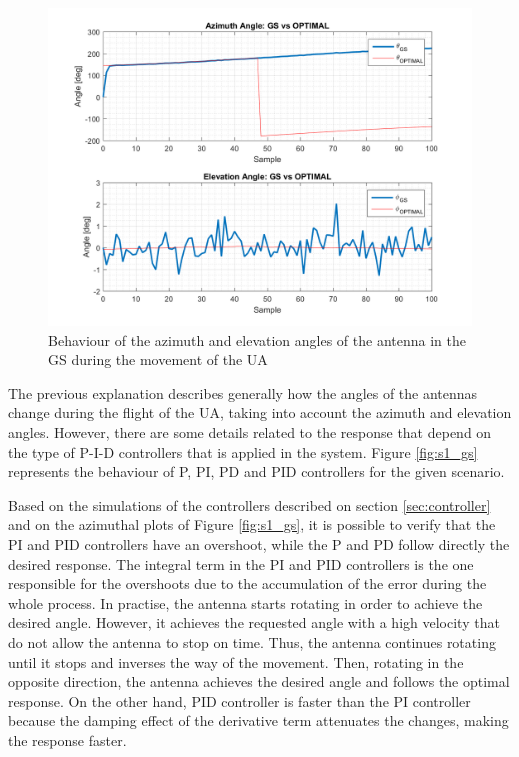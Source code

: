 \begin{figure}[H]
	\centering
	\includegraphics[scale=0.75]{figures/s1_pd_gs.png}
	\caption{Behaviour of the azimuth and elevation angles of the antenna in the GS during the movement of the UA}
	\label{fig:s1_pd_gs_alone}
\end{figure}

The previous explanation describes generally how the angles of the antennas change during the flight of the UA, taking into account the azimuth and elevation angles. However, there are some details related to the response that depend on the type of P-I-D controllers that is applied in the system. Figure \ref{fig:s1_gs} represents the behaviour of P, PI, PD and PID controllers for the given scenario.

Based on the simulations of the controllers described on section \ref{sec:controller} and on the azimuthal plots of Figure \ref{fig:s1_gs}, it is possible to verify that the PI and PID controllers have an overshoot, while the P and PD follow directly the desired response. The integral term in the PI and PID controllers is the one responsible for the overshoots due to the accumulation of the error during the whole process. In practise, the antenna starts rotating in order to achieve the desired angle. However, it achieves the requested angle with a high velocity that do not allow the antenna to stop on time. Thus, the antenna continues rotating until it stops and inverses the way of the movement. Then, rotating in the opposite direction, the antenna achieves the desired angle and follows the optimal response. On the other hand, PID controller is faster than the PI controller because the damping effect of the derivative term attenuates the changes, making the response faster.

